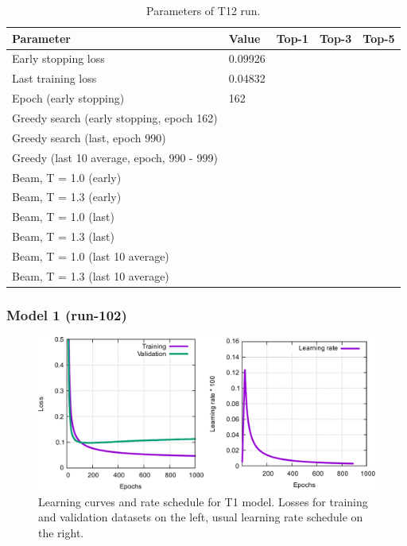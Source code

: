 \documentclass{article}
\begin{document}
\begin{table}[h!]
\caption{Parameters of T12 run.}
  \centering
  \begin{tabular}{p{8.2cm}p{1.5cm}p{1.5cm}p{1.5cm}p{1.5cm}}
    \toprule
    Parameter & Value & Top-1 & Top-3 & Top-5 \\
    \midrule
    Early stopping loss & 0.09926 & & & \\
    Last training loss & 0.04832 & & & \\
    Epoch (early stopping) & 162 & & & \\
    \midrule
    Greedy search (early stopping, epoch 162) &  &  & &\\
    Greedy search (last, epoch 990) &  &  & & \\
    Greedy (last 10 average, epoch, 990 - 999) & &  & & \\
    \midrule
    Beam, T = 1.0 (early) & &  &  &  \\
    Beam, T = 1.3 (early) & &  &  &  \\ 
    \midrule
    Beam, T = 1.0 (last) & &  &  &   \\
    Beam, T = 1.3 (last) & &  &  &  \\ 
    \midrule
    Beam, T = 1.0 (last 10 average) & &  &  &   \\
    Beam, T = 1.3 (last 10 average) & &  &  &  \\ 
    \bottomrule
  \end{tabular}
  \label{tbl:t12}

\end{table} 

\newpage

\subsubsection{Model 1 (run-102)}
  
\begin{figure}[h!]
  \centering
  \includegraphics[width = 16.5cm]{images/t1-3.pdf}
  \caption{Learning curves and rate schedule for T1 model. Losses for training and validation datasets on the left, usual learning rate schedule on the right.}
  \label{fig:t11}
\end{figure}
\end{document}
